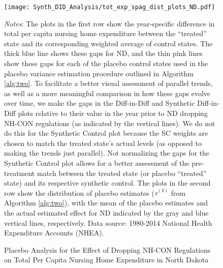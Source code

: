 \documentclass[../Main.tex]{subfiles}
\begin{document}
\newpage
\begin{figure}[t]
	\begin{center}
	\caption{\label{fig: tot_exp_spag_plots_nd} \centering Placebo Analysis for the Effect of Dropping NH-CON Regulations on Total Per Capita Nursing Home Expenditure in North Dakota}
    \texttt{[image: Synth\_DID\_Analysis/tot\_exp\_spag\_dist\_plots\_ND.pdf]}
    \end{center}
    \footnotesize
		\textit{Notes}: The plots in the first row show the year-specific difference in total per capita nursing home expenditure between the ``treated'' state and its corresponding weighted average of control states. The thick blue line shows these gaps for ND, and the thin pink lines show these gaps for each of the placebo control states used in the placebo variance estimation procedure outlined in Algorithm \ref{alg:two}. To facilitate a better visual assessment of parallel trends, as well as a more meaningful comparison in how these gaps evolve over time, we make the gaps in the Diff-in-Diff and Synthetic Diff-in-Diff plots relative to their value in the year prior to ND dropping NH-CON regulations (as indicated by the vertical lines). We do not do this for the Synthetic Control plot because the SC weights are chosen to match the treated state's actual levels (as opposed to making the trends just parallel). Not normalizing the gaps for the Synthetic Control plot allows for a better assessment of the pre-treatment match between the treated state (or placebo ``treated'' state) and its respective synthetic control. The plots in the second row show the distribution of placebo estimates ($\hat{\tau}^{(b)}$ from Algorithm \ref{alg:two}), with the mean of the placebo estimates and the actual estimated effect for ND indicated by the gray and blue vertical lines, respectively. Data source: 1980-2014 National Health Expenditure Accounts (NHEA).
\end{figure}
\clearpage




\end{document}
